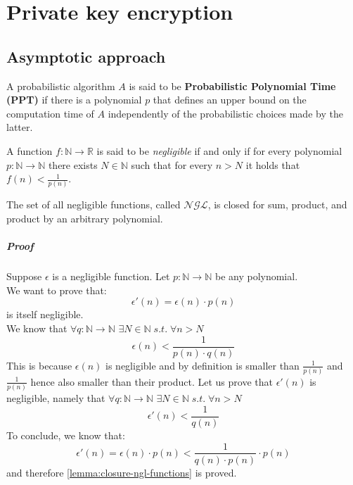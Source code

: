 \documentclass[../main]{subfiles}
\begin{document}
\chapter{Private key encryption}

\section{Asymptotic approach}

\begin{definition}
    A probabilistic algorithm $A$ is said to be \textbf{Probabilistic Polynomial Time (PPT)} if there is a polynomial $p$ that defines an upper bound on the computation time
    of $A$ independently of the probabilistic choices made by the latter.
\end{definition}

\begin{definition}
    A function $f: \mathbb{N} \rightarrow{} \mathbb{R}$ is said to be \textit{negligible} if and only if for every polynomial $p: \mathbb{N} \rightarrow{} \mathbb{N}$
    there exists $N \in{} \mathbb{N}$ such that for every $n > N$ it holds that $f(n) < \frac{1}{p(n)}$.
\end{definition}

\begin{lemma}
    \label{lemma:closure-ngl-functions}
    The set of all negligible functions, called $\mathcal{NGL}$, is closed for sum, product, and product by an arbitrary polynomial.
\end{lemma}

\paragraph{Proof}
Suppose $\epsilon$ is a negligible function. Let $p: \mathbb{N} \rightarrow{} \mathbb{N}$ be any polynomial.\\
We want to prove that:
$$\epsilon'(n) = \epsilon(n)\cdot{}p(n)$$
is itself negligible.\\
We know that $\forall{} q: \mathbb{N} \rightarrow{} \mathbb{N}$ $\exists{} N \in{} \mathbb{N}\; s.t.\;\forall{} n > N$
$$\epsilon(n) < \frac{1}{p(n)\cdot{}q(n)}$$
This is because $\epsilon(n)$ is negligible and by definition is smaller than $\frac{1}{p(n)}$ and $\frac{1}{p(n)}$ hence also smaller than their product.
Let us prove that $\epsilon'(n)$ is negligible, namely that $\forall{} q: \mathbb{N} \rightarrow{} \mathbb{N}$ $\exists{} N \in{} \mathbb{N}\; s.t.\;\forall{} n > N$
$$\epsilon'(n) < \frac{1}{q(n)}$$
To conclude, we know that:
$$\epsilon'(n) = \epsilon(n) \cdot{} p(n) < \frac{1}{q(n)\cdot{}p(n)} \cdot{} p(n)$$
and therefore \ref{lemma:closure-ngl-functions} is proved.
\end{document}
